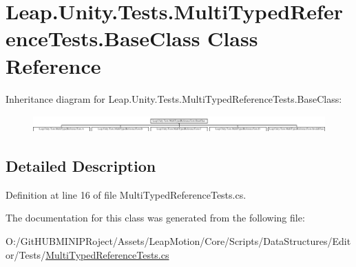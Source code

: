 \hypertarget{class_leap_1_1_unity_1_1_tests_1_1_multi_typed_reference_tests_1_1_base_class}{}\section{Leap.\+Unity.\+Tests.\+Multi\+Typed\+Reference\+Tests.\+Base\+Class Class Reference}
\label{class_leap_1_1_unity_1_1_tests_1_1_multi_typed_reference_tests_1_1_base_class}
Inheritance diagram for Leap.\+Unity.\+Tests.\+Multi\+Typed\+Reference\+Tests.\+Base\+Class\+:\begin{figure}[H]
\begin{center}
\leavevmode
\includegraphics[height=0.660767cm]{class_leap_1_1_unity_1_1_tests_1_1_multi_typed_reference_tests_1_1_base_class}
\end{center}
\end{figure}


\subsection{Detailed Description}


Definition at line 16 of file Multi\+Typed\+Reference\+Tests.\+cs.



The documentation for this class was generated from the following file\+:\begin{DoxyCompactItemize}
\item 
O\+:/\+Git\+H\+U\+B\+M\+I\+N\+I\+P\+Roject/\+Assets/\+Leap\+Motion/\+Core/\+Scripts/\+Data\+Structures/\+Editor/\+Tests/\mbox{\hyperlink{_multi_typed_reference_tests_8cs}{Multi\+Typed\+Reference\+Tests.\+cs}}\end{DoxyCompactItemize}
